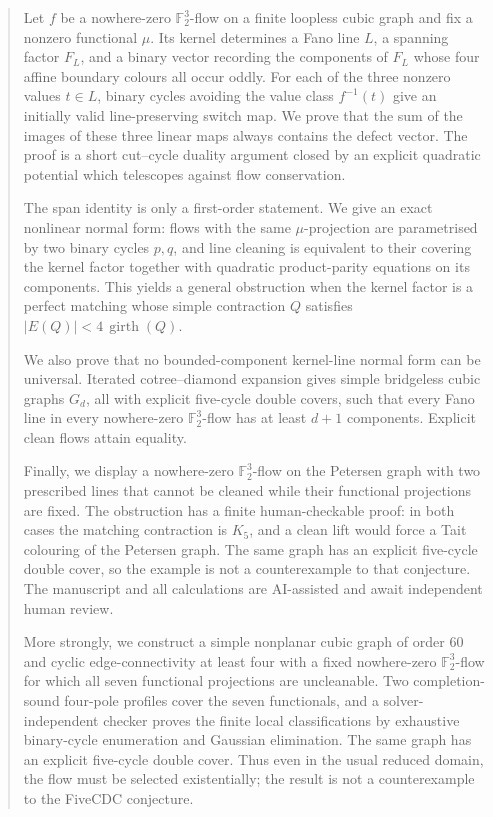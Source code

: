 \documentclass[11pt]{article}
\theoremstyle{definition}
\theoremstyle{remark}
\newcommand{\F}{\mathbb F}
\begin{document}
\begin{abstract}
Let \(f\) be a nowhere-zero \(\F_2^3\)-flow on a finite loopless cubic
graph and fix a nonzero functional \(\mu\).  Its kernel determines a Fano
line \(L\), a spanning factor \(F_L\), and a binary vector recording the
components of \(F_L\) whose four affine boundary colours all occur oddly.
For each of the three nonzero values \(t\in L\), binary cycles avoiding
the value class \(f^{-1}(t)\) give an initially valid line-preserving
switch map.  We prove that the sum of the images of these three linear
maps always contains the defect vector.  The proof is a short
cut--cycle duality argument closed by an explicit quadratic potential
which telescopes against flow conservation.

The span identity is only a first-order statement.  We give an exact
nonlinear normal form: flows with the same \(\mu\)-projection are
parametrised by two binary cycles \(p,q\), and line cleaning is equivalent
to their covering the kernel factor together with quadratic
product-parity equations on its components.  This yields a general
obstruction when the kernel factor is a perfect matching whose simple
contraction \(Q\) satisfies
\(|E(Q)|<4\,\operatorname{girth}(Q)\).

We also prove that no bounded-component kernel-line normal form can be
universal.  Iterated cotree--diamond expansion gives simple bridgeless
cubic graphs \(G_d\), all with explicit five-cycle double covers, such
that every Fano line in every nowhere-zero \(\F_2^3\)-flow has at least
\(d+1\) components.  Explicit clean flows attain equality.

Finally, we display a nowhere-zero \(\F_2^3\)-flow on the Petersen graph
with two prescribed lines that cannot be cleaned while their functional
projections are fixed.  The obstruction has a finite human-checkable
proof: in both cases the matching contraction is \(K_5\), and a clean
lift would force a Tait colouring of the Petersen graph.  The same graph
has an explicit five-cycle double cover, so the example is not a
counterexample to that conjecture.  The manuscript and all calculations
are AI-assisted and await independent human review.

More strongly, we construct a simple nonplanar cubic graph of order 60
and cyclic edge-connectivity at least four with a fixed nowhere-zero
\(\F_2^3\)-flow for which all seven functional projections are
uncleanable.  Two completion-sound four-pole profiles cover the seven
functionals, and a solver-independent checker proves the finite local
classifications by exhaustive binary-cycle enumeration and Gaussian
elimination.  The same graph has an explicit five-cycle double cover.
Thus even in the usual reduced domain, the flow must be selected
existentially; the result is not a counterexample to the FiveCDC
conjecture.
\end{abstract}
\end{document}
